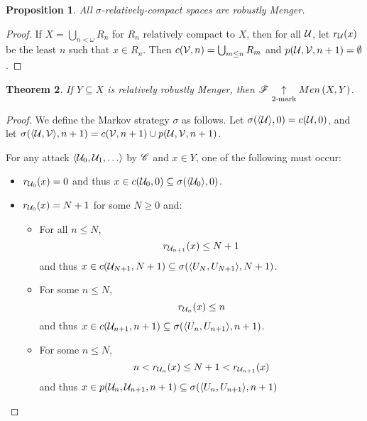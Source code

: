 \documentclass{amsart}
\newtheorem{theorem}{Theorem}[section]
\newtheorem{proposition}[theorem]{Proposition}
\theoremstyle{definition}
\begin{document}
\begin{proposition}
  All \(\sigma\)-relatively-compact spaces are robustly Menger.
\end{proposition}

\begin{proof}
  If \(X=\bigcup_{n<\omega}R_n\) for \(R_n\) relatively compact to \(X\),
  then for all \(\mathcal{U}\), let \(r_{\mathcal{U}}(x)\) be the
  least \(n\) such that \(x\in R_n\). Then \(c(\mathcal{V},n)=\bigcup_{m\leq n}R_m\) and
  \(p(\mathcal{U},\mathcal{V},n+1) = \emptyset\).
\end{proof}

\begin{theorem}
  If \(Y\subseteq X\) is relatively robustly Menger, then
  \(\mathscr{F}\underset{2\text{-mark}}{\uparrow}Men\left({X,Y}\right)\).
\end{theorem}

\begin{proof}
  We define the Markov strategy \(\sigma\) as follows.
  Let \(\sigma(\langle\mathcal{U}\rangle,0)=c(\mathcal{U},0)\), and let
  \(\sigma(\langle\mathcal{U},\mathcal{V}\rangle,n+1)=c(\mathcal{V},n+1)\cup p(\mathcal{U}, \mathcal{V},n+1)\).

  For any attack \(\<\mc{U}_0,\mc{U}_1,\dots\>\) by \(\mathscr{C}\) and \(x\in Y\),
  one of the following must occur:

  \begin{itemize}
    \item
      \(r_{\mathcal{U}_0}(x)=0\) and thus
      \(x\in c(\mathcal{U}_0,0)\subseteq \sigma(\langle\mathcal{U}_0\rangle,0)\).

    \item
      \(r_{\mathcal{U}_0}(x)=N+1\) for some \(N\geq 0\) and:
      \begin{itemize}
        \item
          For all \(n\leq N\),
          \[
            r_{\mathcal{U}_{n+1}}(x)\leq N+1
          \]
          and thus
          \(x\in c(\mathcal{U}_{N+1},N+1) \subseteq
            \sigma(\langle U_N,U_{N+1}\rangle,N+1)\).
        \item
          For some \(n \leq N\),
          \[ r_{\mathcal{U}_n}(x)\leq n \]
          and thus
          \(x\in c(\mathcal{U}_{n+1},n+1) \subseteq
            \sigma(\langle U_n,U_{n+1}\rangle,n+1)\).
        \item
          For some \(n \leq N\),
          \[
            n < r_{\mathcal{U}_n}(x)\leq N+1 < r_{\mathcal{U}_{n+1}}(x)
          \]
         and thus
         \(x\in p(\mathcal{U}_n,\mathcal{U}_{n+1},n+1) \subseteq
          \sigma(\langle U_n,U_{n+1}\rangle,n+1)\)
       \end{itemize}
  \end{itemize}
\end{proof}
\end{document}
